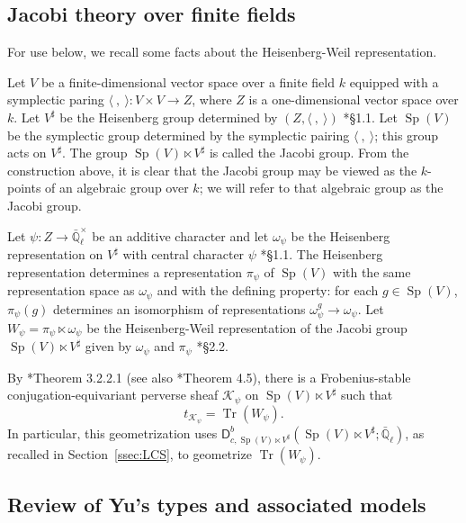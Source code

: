 \documentclass[10pt]{amsart}
\theoremstyle{plain}
\theoremstyle{definition}
\newcommand{\EE}{\mathbb{\bar Q}_\ell}
\newcommand{\Fq}{k}
\newcommand{\EEx}{\EE^\times}
\DeclareMathOperator{\trace}{Tr}
\newcommand{\trFrob}[1]{t_{#1}}
\newcommand{\cs}[1]{{\mathcal{#1}}}
\newcommand{\Sp}{{\operatorname{Sp}}}
\begin{document}
\subsection{Jacobi theory over finite fields}\label{ssec:Jacobi}

For use below, we recall some facts about the Heisenberg-Weil representation.

Let $V$ be a finite-dimensional vector space over a finite field $\Fq$ equipped with a symplectic paring $\langle\ ,\ \rangle : V\times V \to Z$, where $Z$ is a one-dimensional vector space over $\Fq$.
Let $V^\sharp$ be the Heisenberg group determined by $(Z, \langle\ ,\ \rangle)$ \cite{gurevich-hadani:07a}*{\S 1.1}.
Let $\Sp(V)$ be the symplectic group determined by the symplectic pairing $\langle\ ,\ \rangle$; this group acts on $V^\sharp$.
The group $\Sp(V)\ltimes V^\sharp$ is called the Jacobi group. 
From the construction above, it is clear that the Jacobi group may be viewed as the $\Fq$-points of an algebraic group over $\Fq$; we will refer to that algebraic group as the Jacobi group.

Let $\psi : Z \to \EEx$ be an additive character and let $\omega_\psi$ be the Heisenberg representation on $V^\sharp$ with central character $\psi$ \cite{gurevich-hadani:07a}*{\S 1.1}. 
The Heisenberg representation determines a representation $\pi_{\psi}$ of $\Sp(V)$ with the same representation space as $\omega_\psi$ and with the defining property: for each $g\in \Sp(V)$, $\pi_\psi(g)$ determines an isomorphism of representations $\omega_\psi^g \to \omega_\psi$.
Let $W_\psi = \pi_\psi \ltimes \omega_\psi$ be the Heisenberg-Weil representation of the Jacobi group $\Sp(V)\ltimes V^\sharp$ given by $\omega_\psi$ and $\pi_\psi$ \cite{gurevich-hadani:07a}*{\S 2.2}.

By \cite{gurevich-hadani:07a}*{Theorem 3.2.2.1} (see also \cite{gurevich-hadani:11a}*{Theorem 4.5}), there is a Frobenius-stable conjugation-equivariant perverse sheaf $\cs{K}_\psi$ on $\Sp(V)\ltimes V^\sharp$  such that 
\begin{equation}\label{eqn:Jacobi}
\trFrob{\cs{K}_\psi} = \trace(W_\psi).
\end{equation}
%
In particular, this geometrization uses $\mathsf{D}^b_{c,\Sp(V)\ltimes V^\sharp}(\Sp(V)\ltimes V^\sharp;\EE)$, as recalled in Section~\ref{ssec:LCS}, to geometrize $\trace(W_\psi)$. 

\subsection{Review of Yu's types and associated models}\label{ssec:review}
\end{document}
